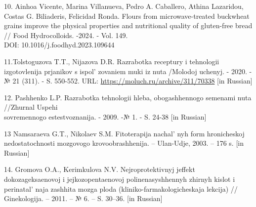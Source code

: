 \begin{references}
10. Ainhoa Vicente, Marina Villanueva, Pedro A. Caballero, Athina
Lazaridou, Costas G. Biliaderis, Felicidad Ronda. Flours from
microwave-treated buckwheat grains improve the physical properties and
nutritional quality of gluten-free bread // Food Hydrocolloids. -2024. -
Vol. 149. \\DOI: 10.1016/j.foodhyd.2023.109644

11.Tolstoguzova T.T., Nijazova D.R. Razrabotka receptury i tehnologii
izgotovlenija prjanikov s ispol' zovaniem muki iz nuta
/Molodoj uchenyj. - 2020. -№ 21 (311). - S. 550-552. URL:
\url{https://moluch.ru/archive/311/70338} {[}in Russian{]}

12. Pashhenko L.P. Razrabotka tehnologii hleba, obogashhennogo semenami
nuta //Zhurnal Uspehi \\sovremennogo estestvoznanija. - 2009. -№ 1. - S.
24-38 {[}in Russian{]}

13 Namsaraeva G.T., Nikolaev S.M. Fitoterapija
nachal' nyh form hronicheskoj nedostatochnosti mozgovogo
krovoobrashhenija. -- Ulan-Udje, 2003. -- 176 s. {[}in Russian{]}

14. Gromova O.A., Kerimkulova N.V. Nejroprotektivnyj jeffekt
dokozageksaenovoj i jejkozopentaenovoj polinenasyshhennyh zhirnyh kislot
i perinatal' naja zashhita mozga ploda
(kliniko-farmakologicheskaja lekcija) // Ginekologija. -- 2011. -- № 6.
-- S. 30--36. {[}in Russian{]}

\end{references}


